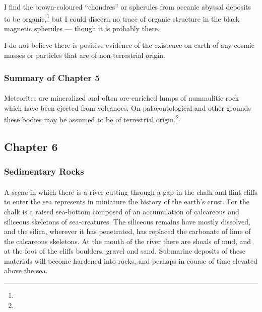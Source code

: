 \documentclass[a4paper, 12pt, oneside]{article}
\begin{document}
I find the brown-coloured ``chondres'' or spherules from oceanic abyssal deposits to be organic,\footnote{} but I could discern no trace of organic structure in the black magnetic spherules --- though it is probably there.

I do not believe there is positive evidence of the existence on earth of any cosmic masses or particles that are of non-terrestrial origin.

\subsubsection{Summary of Chapter 5}
\paragraph{}
Meteorites are mineralized and often ore-enriched lumps of nummulitic rock which have been ejected from volcanoes. On palaeontological and other grounds these bodies may be assumed to be of terrestrial origin.\footnote{}
\clearpage
\subsection{Chapter 6}
\subsubsection{Sedimentary Rocks}
\paragraph{}
A scene in which there is a river cutting through a gap in the chalk and flint cliffs to enter the sea represents in miniature the history of the earth's crust. For the chalk is a raised sea-bottom composed of an accumulation of calcareous and siliceous skeletons of sea-creatures. The siliceous remains have mostly dissolved, and the silica, wherever it has penetrated, has replaced the carbonate of lime of the calcareous skeletons. At the mouth of the river there are shoals of mud, and at the foot of the cliffs boulders, gravel and sand. Submarine deposits of these materials will become hardened into rocks, and perhaps in course of time elevated above the sea.
\end{document}
